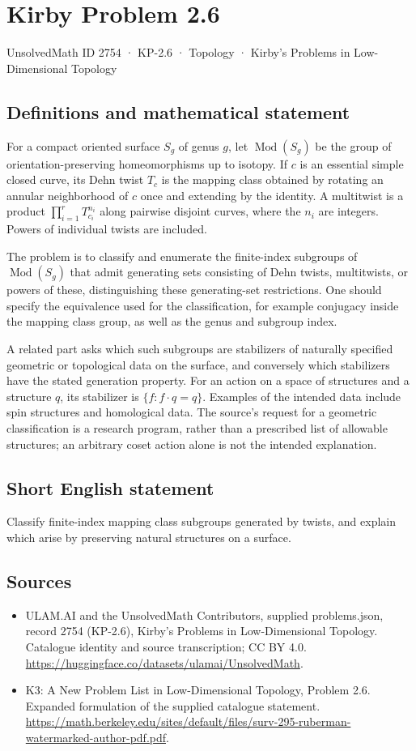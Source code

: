 \documentclass[11pt,a4paper]{article}
\begin{document}
\section*{Kirby Problem 2.6}\label{2754}
{\small UnsolvedMath ID 2754 · KP-2.6 · Topology · Kirby's Problems in Low-Dimensional Topology}
\subsection{Definitions and mathematical statement}
For a compact oriented surface $S_g$ of genus $g$, let $\operatorname{Mod}(S_g)$
be the group of orientation-preserving homeomorphisms up to isotopy. If $c$ is an
essential simple closed curve, its Dehn twist $T_c$ is the mapping class obtained
by rotating an annular neighborhood of $c$ once and extending by the identity.
A multitwist is a product $\prod_{i=1}^r T_{c_i}^{n_i}$ along pairwise disjoint
curves, where the $n_i$ are integers. Powers of individual twists are included.

The problem is to classify and enumerate the finite-index subgroups of
$\operatorname{Mod}(S_g)$ that admit generating sets consisting of Dehn twists,
multitwists, or powers of these, distinguishing these generating-set restrictions.
One should specify the equivalence used for the classification, for example
conjugacy inside the mapping class group, as well as the genus and subgroup index.

A related part asks which such subgroups are stabilizers of naturally specified
geometric or topological data on the surface, and conversely which stabilizers
have the stated generation property. For an action on a space of structures and
a structure $q$, its stabilizer is $\{f:f\cdot q=q\}$. Examples of the intended
data include spin structures and homological data. The source's request for a
geometric classification is a research program, rather than a prescribed list of
allowable structures; an arbitrary coset action alone is not the intended explanation.
\subsection{Short English statement}
Classify finite-index mapping class subgroups generated by twists, and explain which arise by preserving natural structures on a surface.
\subsection{Sources}
\begin{itemize}
\item[S1] ULAM.AI and the UnsolvedMath Contributors, supplied problems.json, record 2754 (KP-2.6), Kirby's Problems in Low-Dimensional Topology. Catalogue identity and source transcription; CC BY 4.0.
\url{https://huggingface.co/datasets/ulamai/UnsolvedMath}.
\item[S2] K3: A New Problem List in Low-Dimensional Topology, Problem 2.6. Expanded formulation of the supplied catalogue statement.
\url{https://math.berkeley.edu/sites/default/files/surv-295-ruberman-watermarked-author-pdf.pdf}.
\end{itemize}
\end{document}
